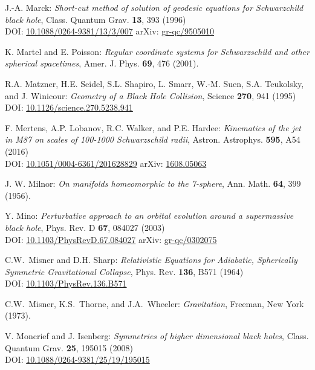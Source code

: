 \begin{thebibliography}{123}
J.-A. Marck:
{\em Short-cut method of solution of geodesic equations for Schwarzchild black hole},
Class. Quantum Grav. {\bf 13}, 393 (1996)\\
DOI: \href{https://doi.org/10.1088/0264-9381/13/3/007}{10.1088/0264-9381/13/3/007}\hfill
arXiv: \href{https://arxiv.org/abs/gr-qc/9505010}{gr-qc/9505010}

K. Martel and E. Poisson:
\emph{Regular coordinate systems for Schwarzschild and other spherical spacetimes},
Amer. J. Phys. {\bf 69}, 476 (2001).

R.A. Matzner, H.E. Seidel, S.L. Shapiro, L. Smarr, W.-M. Suen, S.A. Teukolsky, and
J. Winicour: {\em Geometry of a Black Hole Collision},
Science {\bf 270}, 941 (1995)\\
DOI: \href{https://doi.org/10.1126/science.270.5238.941}{10.1126/science.270.5238.941}

F. Mertens, A.P. Lobanov, R.C. Walker, and P.E. Hardee:
{\em Kinematics of the jet in M87 on scales of 100-1000 Schwarzschild radii},
Astron. Astrophys. {\bf 595}, A54 (2016)\\
DOI: \href{https://doi.org/10.1051/0004-6361/201628829}{10.1051/0004-6361/201628829}\hfill
arXiv: \href{https://arxiv.org/abs/1608.05063}{1608.05063}

J. W. Milnor: {\em On manifolds homeomorphic to the 7-sphere},
Ann. Math. {\bf 64}, 399 (1956).

Y. Mino:
{\em Perturbative approach to an orbital evolution around a supermassive black hole},
Phys. Rev. D {\bf 67}, 084027 (2003)\\
DOI: \href{https://doi.org/10.1103/PhysRevD.67.084027}{10.1103/PhysRevD.67.084027}\hfill
arXiv: \href{https://arxiv.org/abs/gr-qc/0302075}{gr-qc/0302075}

C.W.~Misner and D.H. Sharp:
{\em Relativistic Equations for Adiabatic, Spherically Symmetric Gravitational Collapse},
Phys. Rev. {\bf 136}, B571 (1964)\\
DOI: \href{https://doi.org/10.1103/PhysRev.136.B571}{10.1103/PhysRev.136.B571}

C.W.~Misner, K.S.~Thorne, and J.A.~Wheeler: {\em Gravitation},
Freeman, New York (1973).

V. Moncrief and J. Isenberg:
{\em Symmetries of higher dimensional black holes},
Class. Quantum Grav. {\bf 25}, 195015 (2008)\\
DOI: \href{https://doi.org/10.1088/0264-9381/25/19/195015}{10.1088/0264-9381/25/19/195015}


\end{thebibliography}
